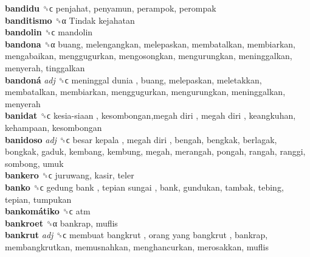 \textbf{bandidu} ␝ϲ  penjahat, penyamun, perampok, perompak  \\
\textbf{banditismo} ␝α   Tindak kejahatan   \\
\textbf{bandolin} ␝ϲ  mandolin  \\
\textbf{bandona} ␝α  buang, melengangkan, melepaskan, membatalkan, membiarkan, mengabaikan, menggugurkan, mengosongkan, mengurungkan, meninggalkan, menyerah, tinggalkan  \\
\textbf{bandoná} \emph{adj}  ␝ϲ   meninggal dunia , buang, melepaskan, meletakkan, membatalkan, membiarkan, menggugurkan, mengurungkan, meninggalkan, menyerah  \\
\textbf{banidat} ␝ϲ   kesia-siaan ,  kesombongan,megah diri ,  megah diri , keangkuhan, kehampaan, kesombongan  \\
\textbf{banidoso} \emph{adj}  ␝ϲ   besar kepala ,  megah diri , bengah, bengkak, berlagak, bongkak, gaduk, kembang, kembung, megah, merangah, pongah, rangah, ranggi, sombong, umuk  \\
\textbf{bankero} ␝ϲ  juruwang, kasir, teler  \\
\textbf{banko} ␝ϲ   gedung bank ,  tepian sungai , bank, gundukan, tambak, tebing, tepian, tumpukan  \\
\textbf{bankomátiko} ␝ϲ  atm  \\
\textbf{bankroet} ␝α  bankrap, muflis  \\
\textbf{bankrut} \emph{adj}  ␝ϲ   membuat bangkrut ,  orang yang bangkrut , bankrap, membangkrutkan, memusnahkan, menghancurkan, merosakkan, muflis  \\
